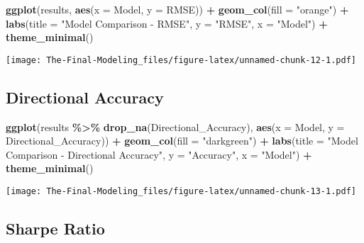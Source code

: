 \documentclass[
]{article}
\newenvironment{Shaded}{\begin{snugshade}}{\end{snugshade}}
\newcommand{\AttributeTok}[1]{\textcolor[rgb]{0.13,0.29,0.53}{#1}}
\newcommand{\FunctionTok}[1]{\textcolor[rgb]{0.13,0.29,0.53}{\textbf{#1}}}
\newcommand{\NormalTok}[1]{#1}
\newcommand{\SpecialCharTok}[1]{\textcolor[rgb]{0.81,0.36,0.00}{\textbf{#1}}}
\newcommand{\StringTok}[1]{\textcolor[rgb]{0.31,0.60,0.02}{#1}}
\begin{document}
\begin{Shaded}
\begin{Highlighting}[]
\FunctionTok{ggplot}\NormalTok{(results, }\FunctionTok{aes}\NormalTok{(}\AttributeTok{x =}\NormalTok{ Model, }\AttributeTok{y =}\NormalTok{ RMSE)) }\SpecialCharTok{+}
  \FunctionTok{geom\_col}\NormalTok{(}\AttributeTok{fill =} \StringTok{"orange"}\NormalTok{) }\SpecialCharTok{+}
  \FunctionTok{labs}\NormalTok{(}\AttributeTok{title =} \StringTok{"Model Comparison {-} RMSE"}\NormalTok{, }\AttributeTok{y =} \StringTok{"RMSE"}\NormalTok{, }\AttributeTok{x =} \StringTok{"Model"}\NormalTok{) }\SpecialCharTok{+}
  \FunctionTok{theme\_minimal}\NormalTok{()}
\end{Highlighting}
\end{Shaded}

\texttt{[image: The-Final-Modeling\_files/figure-latex/unnamed-chunk-12-1.pdf]}

\subsection{Directional Accuracy}\label{directional-accuracy}

\begin{Shaded}
\begin{Highlighting}[]
\FunctionTok{ggplot}\NormalTok{(results }\SpecialCharTok{\%\textgreater{}\%} \FunctionTok{drop\_na}\NormalTok{(Directional\_Accuracy), }\FunctionTok{aes}\NormalTok{(}\AttributeTok{x =}\NormalTok{ Model, }\AttributeTok{y =}\NormalTok{ Directional\_Accuracy)) }\SpecialCharTok{+}
  \FunctionTok{geom\_col}\NormalTok{(}\AttributeTok{fill =} \StringTok{"darkgreen"}\NormalTok{) }\SpecialCharTok{+}
  \FunctionTok{labs}\NormalTok{(}\AttributeTok{title =} \StringTok{"Model Comparison {-} Directional Accuracy"}\NormalTok{, }\AttributeTok{y =} \StringTok{"Accuracy"}\NormalTok{, }\AttributeTok{x =} \StringTok{"Model"}\NormalTok{) }\SpecialCharTok{+}
  \FunctionTok{theme\_minimal}\NormalTok{()}
\end{Highlighting}
\end{Shaded}

\texttt{[image: The-Final-Modeling\_files/figure-latex/unnamed-chunk-13-1.pdf]}

\subsection{Sharpe Ratio}\label{sharpe-ratio}
\end{document}
